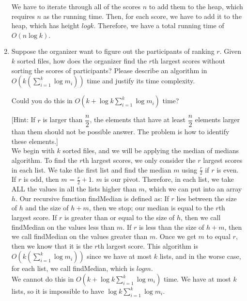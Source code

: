 \documentclass{article}
\begin{document}
\begin{enumerate}
We have to iterate through all of the scores $n$ to add them to the heap, which requires $n$ as the running time. Then, for each score, we have to add it to the heap, which has height $log k$. Therefore, we have a total running time of $O(n\log k)$.

\item Suppose the organizer want to figure out the participants of
  ranking $r$. Given $k$ sorted files, how does the organizer find the
  $r$th largest scores without sorting the scores of participants? Please 
  describe an algorithm in $O(k(\sum_{i=1}^{k}\log m_{i}))$ time and justify
  its time complexity. 

Could you do this in $O(k+\log k \sum_{i=1}^{k}\log m_{i})$ time? 

  [Hint: If $r$ is larger than $\dfrac{n}{2}$, the elements that have at least $\dfrac{n}{2}$ 
  elements larger than them should not be possible answer. The problem is how to identify these
  elements.]\\

We begin with $k$ sorted files, and we will be applying the median of medians algorithm. To find the $r$th largest scores, we only consider the $r$ largest scores in each list. We take the first list and find the median $m$ using $\frac{r}{2}$ if $r$ is even. If $r$ is odd, then $m$ = $\frac{r}{2} + 1$. $m$ is our pivot. Therefore, in each list, we take ALL the values in all the lists higher than $m$, which we can put into an array $h$. Our recursive function findMedian is defined as: If $r$ lies between the size of $h$ and the size of $h + m$, then we stop; our median is equal to the $r$th largest score. If $r$ is greater than or equal to the size of $h$, then we call findMedian on the values less than $m$. If $r$ is less than the size of $h + m$, then we call findMedian on the values greater than $m$. Once we get $m$ to equal $r$, then we know that it is the $r$th largest score. This algorithm is $O(k(\sum_{i=1}^{k}\log m_{i}))$ since we have at most $k$ lists, and in the worse case, for each list, we call findMedian, which is $log m$. \\

We cannot do this in $O(k+\log k \sum_{i=1}^{k}\log m_{i})$ time. We have at most $k$ lists, so it is impossible to have $\log k \sum_{i=1}^{k}\log m_{i}$. \\

\end{enumerate}
\end{document}
